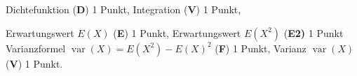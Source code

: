 \begin{bewertung}
\begin{teilaufgaben}
\item Dichtefunktion ({\bf D}) 1 Punkt,
Integration ({\bf V}) 1 Punkt,
\item
Erwartungswert $E(X)$ ({\bf E}) 1 Punkt,
Erwartungswert $E(X^2)$ ({\bf E2)} 1 Punkt
Varianzformel $\operatorname{var}(X)=E(X^2)-E(X)^2$ ({\bf F}) 1 Punkt,
Varianz $\operatorname{var}(X)$ ({\bf V}) 1 Punkt.
\end{teilaufgaben}
\end{bewertung}



